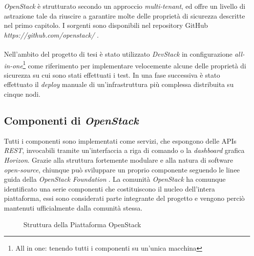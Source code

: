 \documentclass[../main.tex]{subfiles}
\begin{document}
\textit{OpenStack} è strutturato secondo un approccio \textit{multi-tenant}, ed offre un livello di astrazione tale da riuscire a garantire molte delle proprietà di sicurezza descritte nel primo capitolo.
I sorgenti sono disponibili nel repository GitHub \textit{https://github.com/openstack/} .
\paragraph{}
Nell'ambito del progetto di tesi è stato utilizzato \textit{DevStack} in configurazione \textit{all-in-one}\footnote{All in one: tenendo tutti i componenti su un'unica macchina} come riferimento per implementare velocemente alcune delle proprietà di sicurezza su cui sono stati effettuati i test.
In una fase successiva è stato effettuato il \textit{deploy} manuale di un'infrastruttura più complessa distribuita su cinque nodi.

\subsection{Componenti di \textit{OpenStack}}
Tutti i componenti sono implementati come servizi, che espongono delle APIs \textit{REST}, invocabili tramite un'interfaccia a riga di comando o la \textit{dashboard} grafica \textit{Horizon}.
Grazie alla struttura fortemente modulare e alla natura di software \textit{open-source}, chiunque può sviluppare un proprio componente seguendo le linee guida della \textit{OpenStack Foundation} \cite{GuidelinesOpenstackHacking}.
La comunità \textit{OpenStack} ha comunque identificato una serie componenti che costituiscono il nucleo dell'intera piattaforma, essi sono considerati parte integrante del progetto e vengono perciò mantenuti ufficialmente dalla comunità stessa.
\begin{figure}[H]
\centering
{}
\caption{Struttura della Piattaforma OpenStack \cite{OpenstackDiagram}}\label{openstacksw}
\end{figure}
\end{document}
